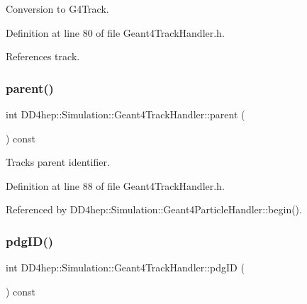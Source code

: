 Conversion to G4\+Track. 



Definition at line 80 of file Geant4\+Track\+Handler.\+h.



References track.

\hypertarget{class_d_d4hep_1_1_simulation_1_1_geant4_track_handler_a9af21d940686e7a243eebea3676b0cca}{}\label{class_d_d4hep_1_1_simulation_1_1_geant4_track_handler_a9af21d940686e7a243eebea3676b0cca} 
\subsubsection{\texorpdfstring{parent()}{parent()}}
{\footnotesize\ttfamily int D\+D4hep\+::\+Simulation\+::\+Geant4\+Track\+Handler\+::parent (\begin{DoxyParamCaption}{ }\end{DoxyParamCaption}) const\hspace{0.3cm}{\ttfamily [inline]}}



Track\textquotesingle{}s parent identifier. 



Definition at line 88 of file Geant4\+Track\+Handler.\+h.



Referenced by D\+D4hep\+::\+Simulation\+::\+Geant4\+Particle\+Handler\+::begin().

\hypertarget{class_d_d4hep_1_1_simulation_1_1_geant4_track_handler_a7211bc51d66addbea6e1f1185b59d270}{}\label{class_d_d4hep_1_1_simulation_1_1_geant4_track_handler_a7211bc51d66addbea6e1f1185b59d270} 
\subsubsection{\texorpdfstring{pdg\+I\+D()}{pdgID()}}
{\footnotesize\ttfamily int D\+D4hep\+::\+Simulation\+::\+Geant4\+Track\+Handler\+::pdg\+ID (\begin{DoxyParamCaption}{ }\end{DoxyParamCaption}) const\hspace{0.3cm}{\ttfamily [inline]}}




